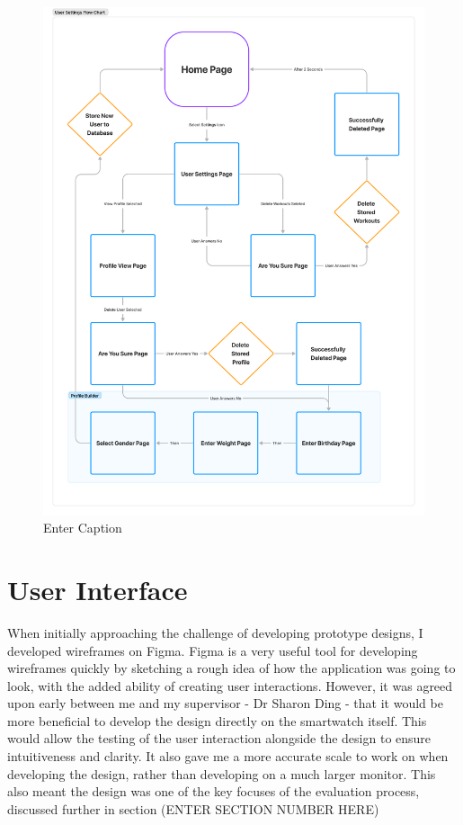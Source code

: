 \documentclass{l4proj}
\begin{document}
\begin{figure}[h!]
    \centering
    \includegraphics[width=0.75\linewidth]{dissertation//dissImages/UserSettingFlow.pdf}
    \caption{Enter Caption}
    \label{fig:enter-label}
\end{figure}

\section{User Interface}

When initially approaching the challenge of developing prototype designs, I developed wireframes on Figma. Figma is a very useful tool for developing wireframes quickly by sketching a rough idea of how the application was going to look, with the added ability of creating user interactions. However, it was agreed upon early between me and my supervisor - Dr Sharon Ding - that it would be more beneficial to develop the design directly on the smartwatch itself. This would allow the testing of the user interaction alongside the design to ensure intuitiveness and clarity. It also gave me a more accurate scale to work on when developing the design, rather than developing on a much larger monitor. This also meant the design was one of the key focuses of the evaluation process, discussed further in section (ENTER SECTION NUMBER HERE)
\end{document}
